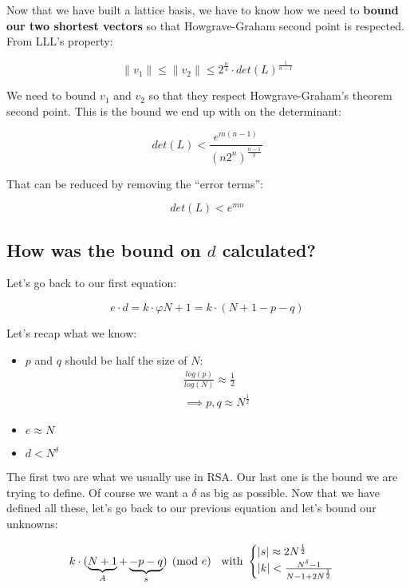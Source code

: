 \documentclass[a4paper,11pt]{article}
\begin{document}
Now that we have built a lattice basis, we have to know how we need to \textbf{bound our two shortest vectors} so that Howgrave-Graham second point is respected. From LLL's property:

\[ \|v_1\| \leq \|v_2\| \leq 2^{\frac{n}{4}} \cdot det(L)^{\frac{1}{n-1}} \]

We need to bound $v_1$ and $v_2$ so that they respect Howgrave-Graham's theorem second point. This is the bound we end up with on the determinant:

\[ det(L) < \frac{e^{m(n-1)}}{(n2^n)^{\frac{n-1}{2}}} \]

That can be reduced by removing the ``error terms'':

\[ det(L) < e^{mn} \]

\subsection{How was the bound on $d$ calculated?}\label{bound-boneh-durfee}

Let's go back to our first equation:

\[ e \cdot d = k \cdot \varphi{N} + 1 = k \cdot (N + 1 - p - q) \]

Let's recap what we know:

\begin{itemize}
	\item{$p$ and $q$ should be half the size of $N$:\\
	\begin{align*}
		 \frac{log(p)}{log(N)} \approx \frac{1}{2}\\
		 \implies p,q \approx N^{\frac{1}{2}}
	\end{align*}}
	\item{$e \approx N$}
	\item{$d < N^\delta$\\}
\end{itemize}

The first two are what we usually use in RSA. Our last one is the bound we are trying to define. Of course we want a $\delta$ as big as possible. Now that we have defined all these, let's go back to our previous equation and let's bound our unknowns:

\[ k \cdot ( \underbrace{N + 1}_A + \underbrace{-p-q}_s) \pmod{e}  \hspace{2mm} \mbox{ with } \begin{cases} |s| \approx 2N^{\frac{1}{2}} \\
 |k| < \frac{N^\delta - 1}{N - 1 + 2N^{\frac{1}{2}}}
 \end{cases} \]
 
\end{document}

